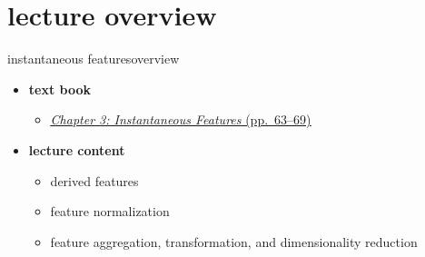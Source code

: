 

\subtitle{Part 4.3: Feature Post-Processing}


	

    \section[overview]{lecture overview}
        \begin{frame}{instantaneous features}{overview}
            \begin{itemize}
                \item   \textbf{text book}  
                    \begin{itemize}
                        \item   \href{http://ieeexplore.ieee.org/xpl/articleDetails.jsp?tp=&arnumber=6331120&}{\underline{\textit{Chapter 3: Instantaneous Features} (pp.~63--69)}}
                    \end{itemize}
                \bigskip
                \item<2->   \textbf{lecture content}
                    \begin{itemize}
                        \item<2->   derived features
                        \item<3->   feature normalization
                        \item<4->   feature aggregation, transformation, and dimensionality reduction
                    \end{itemize}
            \end{itemize}
        \end{frame}

